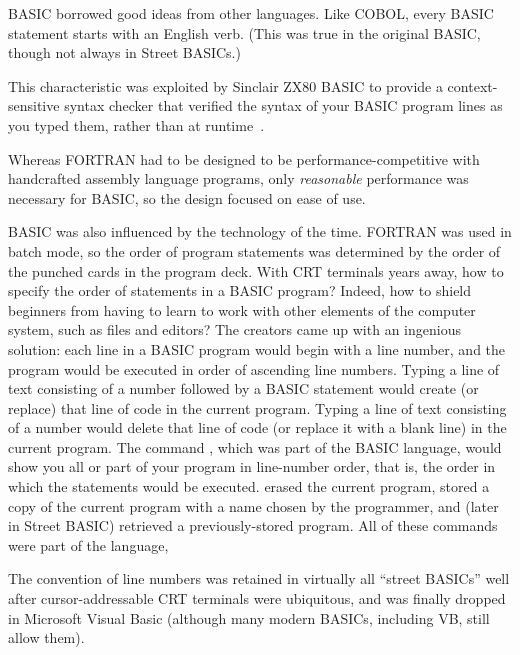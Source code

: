\documentclass{article}
\begin{document}
BASIC borrowed good ideas from other languages.  Like COBOL, every BASIC
statement starts with an English verb.  (This was true in the original
BASIC, though not always in Street BASICs.)

  \begin{geeknote}
   This characteristic was exploited by Sinclair ZX80 BASIC to
    provide a context-sensitive syntax checker that verified the syntax
    of your BASIC program lines as you typed them, rather than at
    runtime~\cite{zx80_basic_techreport}.
  \end{geeknote}


Whereas FORTRAN had to be designed to be performance-competitive with
handcrafted assembly language programs, 
only \emph{reasonable} performance was necessary for BASIC, so the
design focused on 
ease of use.

BASIC was also influenced by the technology of the time.  
FORTRAN was used in batch mode, so the order of program statements was
determined by the order of the punched cards in the program deck.
With CRT terminals years away, how to specify the order of statements in
a BASIC program?  Indeed, how to shield beginners from having to learn
to work with other elements of the computer system, such as files and editors?
The creators came up with an ingenious solution: each line in a BASIC
program would begin with a line number, and the program would be
executed in order of ascending line numbers.
Typing a line of text consisting of a number followed by a BASIC statement
would create (or replace) that line of code in the current program.
Typing a line of text consisting of a number would delete that line of
code (or replace it with a blank line) in the current program.
The command , which was part of the BASIC language, would show
you all or part of your program in line-number order, that is, the order
in which the statements would be executed.   erased the current
program,  stored a copy of the current program with a name
chosen by the programmer, and  (later  in Street BASIC)
retrieved a previously-stored program.  All of these commands were part
of the language,

  \begin{geeknote}
  The convention of line numbers was retained in virtually all ``street
  BASICs'' well after cursor-addressable CRT terminals were ubiquitous,
  and was finally dropped in Microsoft Visual Basic (although many modern
  BASICs, including VB, still allow them).
  \end{geeknote}
\end{document}

